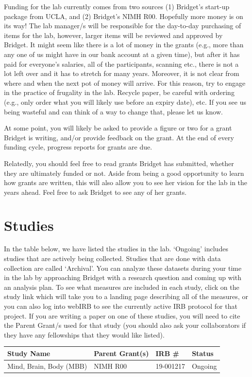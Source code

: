 \documentclass[]{book}
\begin{document}
Funding for the lab currently comes from two sources (1) Bridget's start-up package from UCLA, and (2) Bridget's NIMH R00. Hopefully more money is on its way! The lab manager/s will be responsible for the day-to-day purchasing of items for the lab, however, larger items will be reviewed and approved by Bridget. It might seem like there is a lot of money in the grants (e.g., more than any one of us might have in our bank account at a given time), but after it has paid for everyone's salaries, all of the participants, scanning etc., there is not a lot left over and it has to stretch for many years. Moreover, it is not clear from where and when the next pot of money will arrive. For this reason, try to engage in the practice of frugality in the lab. Recycle paper, be careful with ordering (e.g., only order what you will likely use before an expiry date), etc. If you see us being wasteful and can think of a way to change that, please let us know.

At some point, you will likely be asked to provide a figure or two for a grant Bridget is writing, and/or provide feedback on the grant. At the end of every funding cycle, progress reports for grants are due.

Relatedly, you should feel free to read grants Bridget has submitted, whether they are ultimately funded or not. Aside from being a good opportunity to learn how grants are written, this will also allow you to see her vision for the lab in the years ahead. Feel free to ask Bridget to see any of her grants.

\hypertarget{studies}{%
\chapter{Studies}\label{studies}}

In the table below, we have listed the studies in the lab. `Ongoing' includes studies that are actively being collected. Studies that are done with data collection are called `Archival'. You can analyze these datasets during your time in the lab by approaching Bridget with a research question and coming up with an analysis plan. To see what measures are included in each study, click on the study link which will take you to a landing page describing all of the measures, or you can also log into webIRB to see the currently active IRB protocol for that project. If you are writing a paper on one of these studies, you will need to cite the Parent Grant/s used for that study (you should also ask your collaborators if they have any fellowships that they would like listed).

\begin{longtable}[]{@{}llll@{}}
\toprule
Study Name & Parent Grant(s) & IRB \# & Status\tabularnewline
\midrule
\endhead
Mind, Brain, Body (MBB) & NIMH R00 & 19-001217 & Ongoing\tabularnewline
\bottomrule
\end{longtable}


\end{document}
